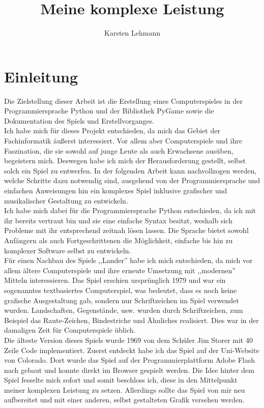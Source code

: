 \documentclass[hidelinks]{article}
\begin{document}
\title{Meine komplexe Leistung}
\author{Karsten Lehmann}
\maketitle
\newpage
\tableofcontents
{}
\newpage 
\section{Einleitung}
Die Zielstellung dieser Arbeit ist die Erstellung eines Computerspieles in der Programmiersprache Python und der Bibliothek PyGame sowie die Dokumentation des Spiels und Erstellvorganges.\\
Ich habe mich für dieses Projekt entschieden, da mich das Gebiet der Fachinformatik äußerst interessiert. Vor allem aber Computerspiele und ihre Faszination, die sie sowohl auf junge Leute als auch Erwachsene ausüben, begeistern mich. Deswegen habe ich mich der Herausforderung gestellt, selbst solch ein Spiel zu entwerfen. In der folgenden Arbeit kann nachvollzogen werden, welche Schritte dazu notwendig sind, ausgehend von der Programmiersprache und einfachen Anweisungen hin ein komplexes Spiel inklusive grafischer und musikalischer Gestaltung zu entwickeln.\\
Ich habe mich dabei für die Programmiersprache Python entschieden, da ich mit ihr bereits vertraut bin und sie eine einfache Syntax besitzt, weshalb sich Probleme mit ihr entsprechend zeitnah lösen lassen. Die Sprache bietet sowohl Anfängern als auch Fortgeschrittenen die Möglichkeit, einfache bis hin zu komplexer Software selbst zu entwickeln.\\
Für einen Nachbau des Spiels ,,Lander'' habe ich mich entschieden, da mich vor allem ältere Computerspiele und ihre erneute Umsetzung mit ,,modernen'' Mitteln interessieren. Das Spiel erschien ursprünglich 1979 und war ein sogenanntes textbasiertes Computerspiel, was bedeutet, dass es noch keine grafische Ausgestaltung gab, sondern nur Schriftzeichen im Spiel verwendet wurden.\cite{WikipediaLander} Landschaften, Gegenstände, usw. wurden durch Schriftzeichen, zum Beispiel das Raute-Zeichen, Bindestriche und Ähnliches realisiert. Dies war in der damaligen Zeit für Computerspiele üblich.\\
Die älteste Version dieses Spiels wurde 1969 von dem Schüler Jim Storer mit 40 Zeile Code implementiert.\cite{ErsteVersion}
Zuerst entdeckt habe ich das Spiel auf der Uni-Website von Colorado.\cite{UniColorado}  Dort wurde das Spiel auf der Programmierplattform Adobe Flash nach gebaut und konnte direkt im Browser gespielt werden. Die Idee hinter dem Spiel fesselte mich sofort und somit beschloss ich, diese in den Mittelpunkt meiner komplexen Leistung zu setzen. Allerdings sollte das Spiel von mir neu aufbereitet und mit einer anderen, selbst gestalteten Grafik versehen werden.\\
\end{document}
